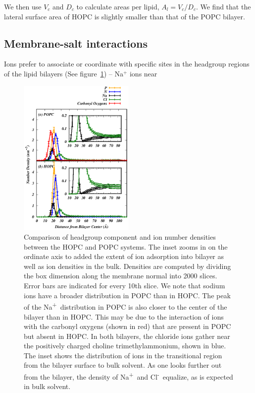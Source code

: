 \documentclass[12pt,preprint,times,openany,draft]{book}
\newcommand{\na}{Na\textsuperscript{+}~}
\newcommand{\cl}{Cl\textsuperscript{-}~}
\begin{document}
We then use $V_c$ and $D_c$ to calculate areas per lipid, $A_l = V_c / D_c$. We find that the 
lateral surface area of HOPC is slightly smaller than that of the POPC bilayer.

\subsection{Membrane-salt interactions}

Ions prefer to associate or coordinate with specific sites 
in the headgroup regions of the lipid bilayers (See figure~\ref{fig:numberdens}) -- Na$^+$ ions near 
\begin{figure}[t]
\caption{ 
Comparison of headgroup component and ion number densities between the HOPC and POPC systems. The 
inset zooms in on the ordinate axis to added the extent of ion 
adsorption into bilayer as well as ion densities in the bulk. Densities are computed by dividing 
the box dimension along the membrane normal into 2000 slices. Error bars are indicated for every 10th slice. 
We note that sodium ions have a broader distribution in POPC than in HOPC. The peak of the \na distribution in 
POPC is also closer to the center of the bilayer than in HOPC. This may be due 
to the interaction of ions with the carbonyl oxygens (shown in red) 
that are present in POPC but absent in HOPC. In both bilayers, the chloride ions 
gather near the positively charged choline trimethylammonium, shown in blue. The 
inset shows the distribution of ions in the transitional region from the bilayer surface to bulk solvent. As one 
looks further out from the bilayer, the density of \na and \cl equalize, as is expected in bulk solvent. 
}
\label{fig:numberdens}
\includegraphics[width=	0.5\textwidth]{density.eps}
\end{figure}
\end{document}
